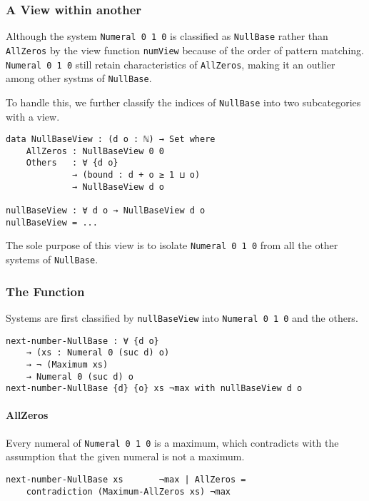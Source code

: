 \documentclass[\main/thesis.tex]{subfiles}
\begin{document}
\subsubsection{A View within another}

Although the system {\lstinline|Numeral 0 1 0|} is classified as {\lstinline|NullBase|}
rather than {\lstinline|AllZeros|} by the view function {\lstinline|numView|}
because of the order of pattern matching.
{\lstinline|Numeral 0 1 0|} still retain characteristics of {\lstinline|AllZeros|},
making it an outlier among other systms of {\lstinline|NullBase|}.

To handle this, we further classify the indices of {\lstinline|NullBase|} into
two subcategories with a view.

\begin{lstlisting}
data NullBaseView : (d o : ℕ) → Set where
    AllZeros : NullBaseView 0 0
    Others   : ∀ {d o}
             → (bound : d + o ≥ 1 ⊔ o)
             → NullBaseView d o

nullBaseView : ∀ d o → NullBaseView d o
nullBaseView = ...
\end{lstlisting}

The sole purpose of this view is to isolate {\lstinline|Numeral 0 1 0|} from
all the other systems of {\lstinline|NullBase|}.

\subsubsection{The Function}


Systems are first classified by {\lstinline|nullBaseView|} into {\lstinline|Numeral 0 1 0|}
and the others.

\begin{lstlisting}[basicstyle=\ttfamily\scriptsize]
next-number-NullBase : ∀ {d o}
    → (xs : Numeral 0 (suc d) o)
    → ¬ (Maximum xs)
    → Numeral 0 (suc d) o
next-number-NullBase {d} {o} xs ¬max with nullBaseView d o
\end{lstlisting}

\paragraph{AllZeros}

Every numeral of {\lstinline|Numeral 0 1 0|} is a maximum, which contradicts
with the assumption that the given numeral is not a maximum.

\begin{lstlisting}[basicstyle=\ttfamily\scriptsize]
next-number-NullBase xs       ¬max | AllZeros =
    contradiction (Maximum-AllZeros xs) ¬max
\end{lstlisting}
\end{document}
